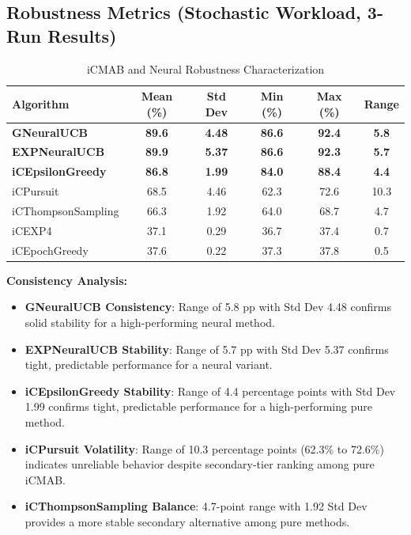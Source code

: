 \documentclass[12pt,a4paper]{article}
\newcommand{\secondarytext}[1]{\textcolor{secondaryblue}{\textbf{#1}}}
\newcommand{\success}[1]{\textcolor{accentgreen}{\textbf{#1}}}
\newcommand{\warning}[1]{\textcolor{warningred}{\textbf{#1}}}
\newcommand{\legacy}[1]{\textcolor{legacycolor}{\textbf{#1}}}
\newcommand{\neural}[1]{\textcolor{neuralcolor}{\textbf{#1}}}
\begin{document}
\subsection{Robustness Metrics (Stochastic Workload, 3-Run Results)}

\begin{table}[H]
\centering
\caption{iCMAB and Neural Robustness Characterization}
\label{tab:robustness}
\begin{tabular}{@{}lccccc@{}}
\toprule
\textbf{Algorithm} & \textbf{Mean (\%)} & \textbf{Std Dev} & \textbf{Min (\%)} & \textbf{Max (\%)} & \textbf{Range} \\
\midrule
\neural{GNeuralUCB}        & \neural{89.6} & \neural{4.48} & \neural{86.6} & \neural{92.4} & \neural{5.8} \\
\legacy{EXPNeuralUCB}       & \legacy{89.9} & \legacy{5.37} & \legacy{86.6} & \legacy{92.3} & \legacy{5.7} \\
\success{iCEpsilonGreedy}   & \success{86.8} & \success{1.99} & \success{84.0} & \success{88.4} & \success{4.4} \\
iCPursuit                   & 68.5 & 4.46 & 62.3 & 72.6 & 10.3 \\
iCThompsonSampling          & 66.3 & 1.92 & 64.0 & 68.7 & 4.7 \\
iCEXP4                      & 37.1 & 0.29 & 36.7 & 37.4 & 0.7 \\
iCEpochGreedy               & 37.6 & 0.22 & 37.3 & 37.8 & 0.5 \\
\bottomrule
\end{tabular}
\end{table}

\textbf{Consistency Analysis:}
\begin{itemize}
\item \neural{GNeuralUCB Consistency}: Range of 5.8 pp with Std Dev 4.48 confirms solid stability for a high-performing neural method.
\item \legacy{EXPNeuralUCB Stability}: Range of 5.7 pp with Std Dev 5.37 confirms tight, predictable performance for a neural variant.
\item \success{iCEpsilonGreedy Stability}: Range of 4.4 percentage points with Std Dev 1.99 confirms tight, predictable performance for a high-performing pure method.
\item \warning{iCPursuit Volatility}: Range of 10.3 percentage points (62.3\% to 72.6\%) indicates unreliable behavior despite secondary-tier ranking among pure iCMAB.
\item \secondarytext{iCThompsonSampling Balance}: 4.7-point range with 1.92 Std Dev provides a more stable secondary alternative among pure methods.
\end{itemize}
\end{document}
